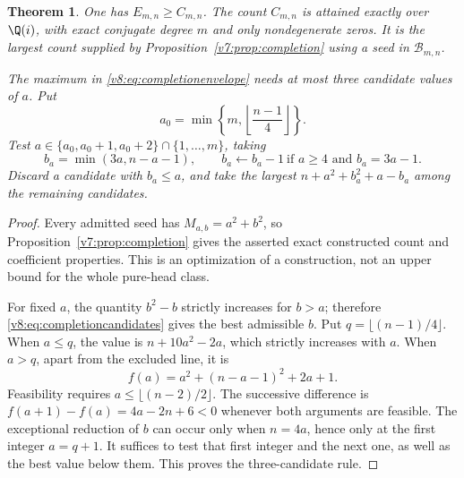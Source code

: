 \documentclass[UTF8,11pt]{ctexart}
\newtheorem{thm}{Theorem}[section]
\theoremstyle{definition}
\numberwithin{equation}{section}
\begin{document}
\begin{thm}\label{v8:thm:completionenvelope}
One has $E_{m,n}\ge C_{m,n}$. The count $C_{m,n}$ is attained
exactly over $\Q(i)$, with exact conjugate degree $m$ and only
nondegenerate zeros. It is the largest count supplied by
Proposition~\ref{v7:prop:completion} using a seed in
$\mathcal B_{m,n}$.

The maximum in \eqref{v8:eq:completionenvelope} needs at most three
candidate values of $a$. Put
\[
 a_0=\min\left\{m,\left\lfloor\frac{n-1}{4}\right\rfloor\right\}.
\]
Test $a\in\{a_0,a_0+1,a_0+2\}\cap\{1,\ldots,m\}$, taking
\begin{equation}\label{v8:eq:completioncandidates}
 b_a=\min(3a,n-a-1),\qquad
 b_a\leftarrow b_a-1\ \text{if }a\ge4\text{ and }b_a=3a-1.
\end{equation}
Discard a candidate with $b_a\le a$, and take the largest
$n+a^2+b_a^2+a-b_a$ among the remaining candidates.
\end{thm}
\begin{proof}
Every admitted seed has $M_{a,b}=a^2+b^2$, so
Proposition~\ref{v7:prop:completion} gives the asserted exact
constructed count and coefficient properties. This is an
optimization of a construction, not an upper bound for the whole
pure-head class.

For fixed $a$, the quantity $b^2-b$ strictly increases for $b>a$;
therefore \eqref{v8:eq:completioncandidates} gives the best admissible
$b$. Put $q=\lfloor(n-1)/4\rfloor$. When $a\le q$, the value is
$n+10a^2-2a$, which strictly increases with $a$. When $a>q$,
apart from the excluded line, it is
\[
 f(a)=a^2+(n-a-1)^2+2a+1.
\]
Feasibility requires $a\le\lfloor(n-2)/2\rfloor$. The successive
difference is $f(a+1)-f(a)=4a-2n+6<0$ whenever both arguments
are feasible. The exceptional reduction of $b$ can occur only
when $n=4a$, hence only at the first integer $a=q+1$.
It suffices to test that first integer and the next one, as well
as the best value below them. This proves the three-candidate rule.
\end{proof}
\end{document}
